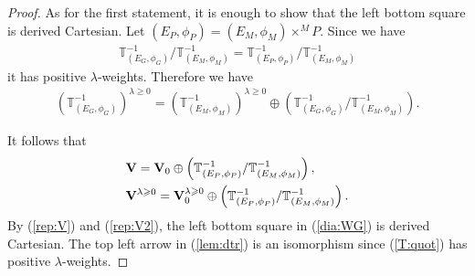 \documentclass [11pt,oneside,a4paper,mathscr]{amsart}
\theoremstyle{definition}
\renewcommand{\geq}{\geqslant}
\begin{document}
\begin{proof}
As for the first statement, it is enough to show that the left bottom square is derived Cartesian. 
Let $(E_P, \phi_P)=(E_M, \phi_M)\times^M P$.
Since we have 
\begin{align}\label{T:quot}\mathbb{T}^{-1}_{(E_G, \phi_G)}/\mathbb{T}^{-1}_{(E_M, \phi_M)}
=\mathbb{T}^{-1}_{(E_P, \phi_P)}/\mathbb{T}^{-1}_{(E_M, \phi_M)}
\end{align}
it has positive $\lambda$-weights. Therefore we have 
\begin{align*}
    (\mathbb{T}^{-1}_{(E_G, \phi_G)})^{\lambda \geq 0}=
     (\mathbb{T}^{-1}_{(E_M, \phi_M)})^{\lambda \geq 0}
     \oplus \left(\mathbb{T}^{-1}_{(E_G, \phi_G)}/\mathbb{T}^{-1}_{(E_M, \phi_M)}\right).
\end{align*}

It follows that 
\begin{align*}
    &\mathbf{V}=\mathbf{V}_0 \oplus \left(\mathbb{T}^{-1}_{(E_P, \phi_P)}/\mathbb{T}^{-1}_{(E_M, \phi_M)}\right), \\ \notag
        &\mathbf{V}^{\lambda \geq 0}=\mathbf{V}_0^{\lambda \geq 0} \oplus \left(\mathbb{T}^{-1}_{(E_P, \phi_P)}/\mathbb{T}^{-1}_{(E_M, \phi_M)}\right).
\end{align*}
By (\ref{rep:V}) and (\ref{rep:V2}), the left bottom square in (\ref{dia:WG}) is 
derived Cartesian. 
The top left arrow in (\ref{lem:dtr}) is an isomorphism since (\ref{T:quot}) has positive $\lambda$-weights. 
\end{proof}
\end{document}
